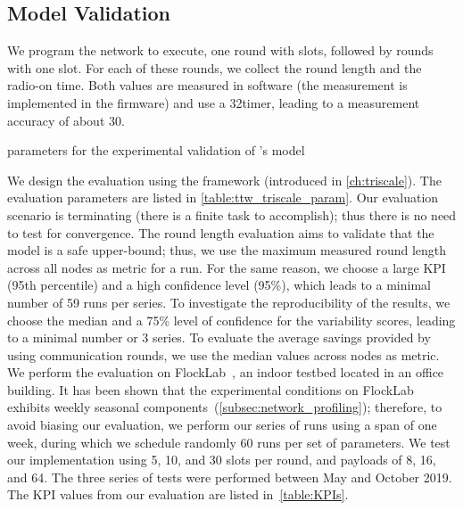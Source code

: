 \subsection{Model Validation}

\squarepar{%
  We now evaluate the runtime execution of our implementation and aim to validate our \TTnet model.
  In particular, it is important that the round length model gives safe upper-bounds since the \TTW scheduler relies on the model to schedule messages and tasks: if a round overruns, this may delay the execution of subsequent tasks and cause deadline misses.
  We test our \TTnet implementation for different number of slots per round \nslots and payload size $L$, we measure the round length and radio-on time experienced by the different nodes in the network, and we compare the results with the \TTnet model.%
}

We program the network to execute, one round with \nslots slots, followed by \nslots rounds with one slot.
For each of these rounds, we collect the round length and the radio-on time. Both values are measured in software (\ie the measurement is implemented in the firmware) and use a 32\kHz timer, leading to a measurement accuracy of about 30\us.

\begin{table}
  \centering
  \caption{\triscale parameters for the experimental validation of \TTnet's model}
  \label{table:ttw_triscale_param}
  {\smaller }
\end{table}


We design the evaluation using the \triscale framework (introduced in \cref{ch:triscale}). The evaluation parameters are listed in \cref{table:ttw_triscale_param}.
Our evaluation scenario is terminating (there is a finite task to accomplish); thus there is no need to test for convergence.
The round length evaluation aims to validate that the \TTnet model is a safe upper-bound; thus, we use the maximum measured round length across all nodes as metric for a run.
For the same reason, we choose a large KPI (95th percentile) and a high confidence level (95\%), which leads to a minimal number of 59 runs per series.
To investigate the reproducibility of the results, we choose the median and a 75\% level of confidence for the variability scores, leading to a minimal number or 3 series.
To evaluate the average savings provided by using communication rounds, we use the median values across nodes as metric.
We perform the evaluation on FlockLab~\cite{FlockLab}, an indoor testbed located in an office building. It has been shown that the experimental conditions on FlockLab exhibits weekly seasonal components~(\cref{subsec:network_profiling}); therefore, to avoid biasing our evaluation, we perform our series of runs using a span of one week, during which we schedule randomly 60 runs per set of parameters. We test our \TTnet implementation using 5, 10, and 30 slots per round, and payloads of 8, 16, and 64\bytes.
The three series of tests were performed between May and October 2019.
The KPI values from our evaluation are listed in~\cref{table:KPIs}.


